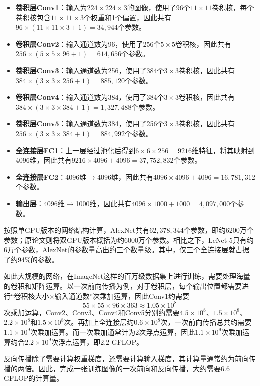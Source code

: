 \begin{itemize}
    \item \textbf{卷积层Conv1}：输入为$224\times224\times3$的图像，使用了96个$11\times11$卷积核，每个卷积核包含$11\times11\times3$个权重和1个偏置，因此共有$96\times(11\times11\times3+1)=34,944$个参数。
    \item \textbf{卷积层Conv2}：输入通道数为96，使用了256个$5\times5$卷积核，因此共有$256\times(5\times5\times96+1)=614,656$个参数。
    \item \textbf{卷积层Conv3}：输入通道数为256，使用了384个$3\times3$卷积核，因此共有$384\times(3\times3\times256+1)=885,120$个参数。
    \item \textbf{卷积层Conv4}：输入通道数为384，使用了384个$3\times3$卷积核，因此共有$384\times(3\times3\times384+1)=1,327,488$个参数。
    \item \textbf{卷积层Conv5}：输入通道数为384，使用了256个$3\times3$卷积核，因此共有$256\times(3\times3\times384+1)=884,992$个参数。
    \item \textbf{全连接层FC1}：上一层经过池化后得到$6\times6\times256=9216$维特征，将其映射到4096维，因此共有$9216\times4096+4096=37,752,832$个参数。
    \item \textbf{全连接层FC2}：4096维$\rightarrow$4096维，因此共有$4096\times4096+4096=16,781,312$个参数。
    \item \textbf{输出层}：4096维$\rightarrow$1000维，因此共有$4096\times1000+1000=4,097,000$个参数。
\end{itemize}
按照单GPU版本的网络结构计算，AlexNet共有$62,378,344$个参数，即约6200万个参数；原论文则将双GPU版本概括为约6000万个参数。相比之下，LeNet-5只有约6万个参数，AlexNet的参数量高出约三个数量级。其中，仅三个全连接层就占据了约94\%的参数。

如此大规模的网络，在ImageNet这样的百万级数据集上进行训练，需要处理海量的卷积和矩阵运算。以一次前向传播为例，对于卷积层，每个输出位置都需要进行“卷积核大小$\times$输入通道数”次乘加运算，因此Conv1约需要
$$
55\times55\times96\times363\approx1.05\times10^8
$$
次乘加运算，Conv2、Conv3、Conv4和Conv5分别约需要$4.5\times10^8$、$1.5\times10^8$、$2.2\times10^8$和$1.5\times10^8$次。再加上全连接层约$0.6\times10^8$次，一次前向传播总共约需要$1.1\times10^9$次乘加运算。而一次乘加通常计为2次浮点运算，因此$1.1\times10^9$次乘加运算约合$2.2\times10^9$次浮点运算，即$2.2$ GFLOP。

反向传播除了需要计算权重梯度，还需要计算输入梯度，其计算量通常约为前向传播的两倍。因此，完成一张训练图像的一次前向和反向传播，大约需要$6.6$ GFLOP的计算量。

